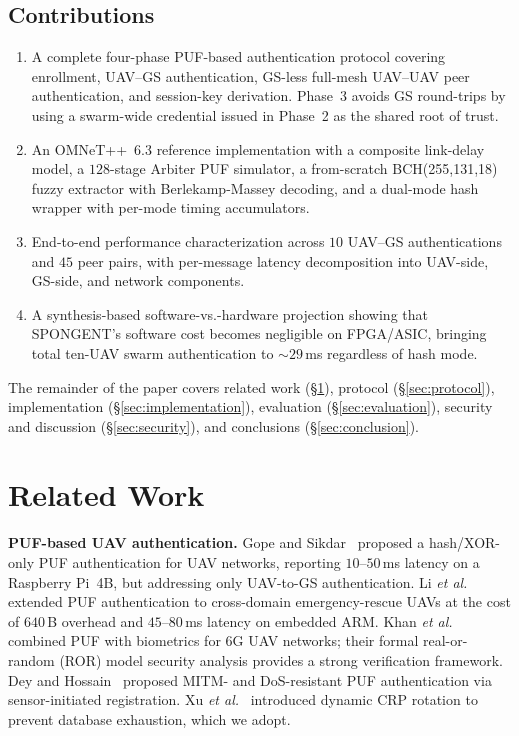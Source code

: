 \documentclass[conference,a4paper,10pt]{IEEEtran}
\begin{document}
\subsection*{Contributions}
\begin{enumerate}
\item A complete four-phase PUF-based authentication protocol
  covering enrollment, UAV--GS authentication, GS-less full-mesh
  UAV--UAV peer authentication, and session-key derivation. Phase~3
  avoids GS round-trips by using a swarm-wide credential issued in
  Phase~2 as the shared root of trust.
\item An OMNeT++~6.3 reference implementation with a composite
  link-delay model, a $128$-stage Arbiter PUF simulator, a
  from-scratch BCH(255,131,18) fuzzy extractor with Berlekamp-Massey
  decoding, and a dual-mode hash wrapper with per-mode timing
  accumulators.
\item End-to-end performance characterization across $10$ UAV--GS
  authentications and $45$ peer pairs, with per-message latency
  decomposition into UAV-side, GS-side, and network components.
\item A synthesis-based software-vs.-hardware projection showing
  that SPONGENT's software cost becomes negligible on FPGA/ASIC,
  bringing total ten-UAV swarm authentication to $\sim 29$\,ms
  regardless of hash mode.
\end{enumerate}

The remainder of the paper covers related work
(\S\ref{sec:related}), protocol (\S\ref{sec:protocol}),
implementation (\S\ref{sec:implementation}), evaluation
(\S\ref{sec:evaluation}), security and discussion
(\S\ref{sec:security}), and conclusions (\S\ref{sec:conclusion}).


\section{Related Work}
\label{sec:related}

\textbf{PUF-based UAV authentication.}
Gope and Sikdar~\cite{puf_lightweight_uav} proposed a hash/XOR-only
PUF authentication for UAV networks, reporting $10$--$50$\,ms
latency on a Raspberry Pi~4B, but addressing only UAV-to-GS
authentication. Li \textit{et al.}~\cite{puf_uav_cross_domain}
extended PUF authentication to cross-domain emergency-rescue UAVs at
the cost of $640$\,B overhead and $45$--$80$\,ms latency on embedded
ARM. Khan \textit{et al.}~\cite{puf_6g_uav} combined PUF with
biometrics for $6$G UAV networks; their formal real-or-random (ROR)
model security analysis provides a strong verification framework.
Dey and Hossain~\cite{puf_mitm_dos} proposed MITM- and DoS-resistant
PUF authentication via sensor-initiated registration. Xu \textit{et
al.}~\cite{arbiter_puf_iot} introduced dynamic CRP rotation to
prevent database exhaustion, which we adopt.
\end{document}
